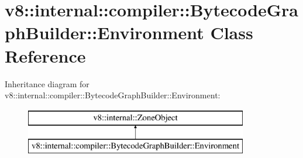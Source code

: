 \hypertarget{classv8_1_1internal_1_1compiler_1_1_bytecode_graph_builder_1_1_environment}{}\section{v8\+:\+:internal\+:\+:compiler\+:\+:Bytecode\+Graph\+Builder\+:\+:Environment Class Reference}
\label{classv8_1_1internal_1_1compiler_1_1_bytecode_graph_builder_1_1_environment}
Inheritance diagram for v8\+:\+:internal\+:\+:compiler\+:\+:Bytecode\+Graph\+Builder\+:\+:Environment\+:\begin{figure}[H]
\begin{center}
\leavevmode
\includegraphics[height=2.000000cm]{classv8_1_1internal_1_1compiler_1_1_bytecode_graph_builder_1_1_environment}
\end{center}
\end{figure}
